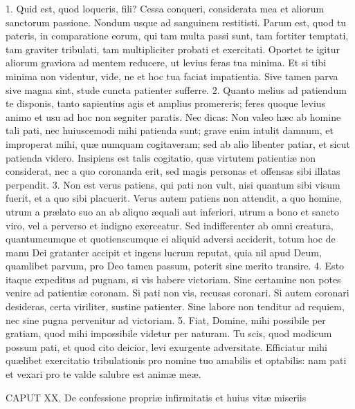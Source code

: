 1. Quid est, quod loqueris, fili? Cessa conqueri, considerata mea et aliorum sanctorum passione. Nondum usque ad sanguinem restitisti. Parum est, quod tu pateris, in comparatione eorum, qui tam multa passi sunt, tam fortiter temptati, tam graviter tribulati, tam multipliciter probati et exercitati. Oportet te igitur aliorum graviora ad mentem reducere, ut levius feras tua minima. Et si tibi minima non videntur, vide, ne et hoc tua faciat impatientia. Sive tamen parva sive magna sint, stude cuncta patienter sufferre.
2. Quanto melius ad patiendum te disponis, tanto sapientius agis et amplius promereris; feres quoque levius animo et usu ad hoc non segniter paratis. Nec dicas: Non valeo hæc ab homine tali pati, nec huiuscemodi mihi patienda sunt; grave enim intulit damnum, et improperat mihi, quæ numquam cogitaveram; sed ab alio libenter patiar, et sicut patienda videro. Insipiens est talis cogitatio, quæ virtutem patientiæ non considerat, nec a quo coronanda erit, sed magis personas et offensas sibi illatas perpendit.
3. Non est verus patiens, qui pati non vult, nisi quantum sibi visum fuerit, et a quo sibi placuerit. Verus autem patiens non attendit, a quo homine, utrum a prælato suo an ab aliquo æquali aut inferiori, utrum a bono et sancto viro, vel a perverso et indigno exerceatur. Sed indifferenter ab omni creatura, quantumcumque et quotienscumque ei aliquid adversi acciderit, totum hoc de manu Dei gratanter accipit et ingens lucrum reputat, quia nil apud Deum, quamlibet parvum, pro Deo tamen passum, poterit sine merito transire.
4. Esto itaque expeditus ad pugnam, si vis habere victoriam. Sine certamine non potes venire ad patientiæ coronam. Si pati non vis, recusas coronari. Si autem coronari desideras, certa viriliter, sustine patienter. Sine labore non tenditur ad requiem, nec sine pugna pervenitur ad victoriam.
5. Fiat, Domine, mihi possibile per gratiam, quod mihi impossibile videtur per naturam. Tu scis, quod modicum possum pati, et quod cito deicior, levi exurgente adversitate. Efficiatur mihi quælibet exercitatio tribulationis pro nomine tuo amabilis et optabilis: nam pati et vexari pro te valde salubre est animæ meæ.


CAPUT XX.
De confessione propriæ infirmitatis et huius vitæ miseriis

